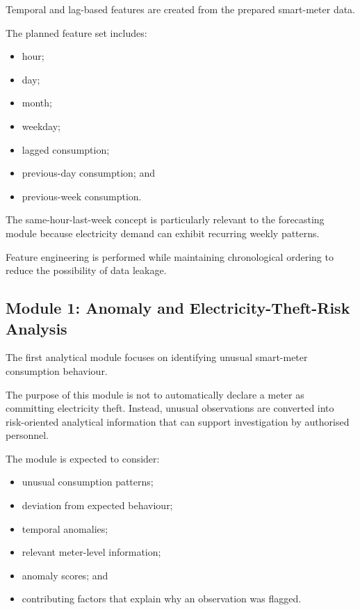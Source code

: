 \documentclass{tietreport}
\begin{document}
Temporal and lag-based features are created from the prepared smart-meter
data.

The planned feature set includes:

\begin{itemize}
    \item hour;
    \item day;
    \item month;
    \item weekday;
    \item lagged consumption;
    \item previous-day consumption; and
    \item previous-week consumption.
\end{itemize}

The same-hour-last-week concept is particularly relevant to the forecasting
module because electricity demand can exhibit recurring weekly patterns.

Feature engineering is performed while maintaining chronological ordering
to reduce the possibility of data leakage.

\subsection{Module 1: Anomaly and Electricity-Theft-Risk Analysis}

The first analytical module focuses on identifying unusual smart-meter
consumption behaviour.

The purpose of this module is not to automatically declare a meter as
committing electricity theft. Instead, unusual observations are converted
into risk-oriented analytical information that can support investigation by
authorised personnel.

The module is expected to consider:

\begin{itemize}
    \item unusual consumption patterns;
    \item deviation from expected behaviour;
    \item temporal anomalies;
    \item relevant meter-level information;
    \item anomaly scores; and
    \item contributing factors that explain why an observation was flagged.
\end{itemize}
\end{document}
